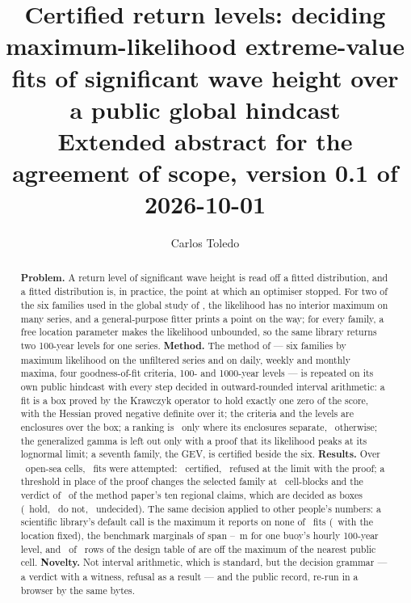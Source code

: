 \documentclass[preprint,10pt,authoryear]{elsarticle}
\begin{document}
\begin{frontmatter}

\title{Certified return levels: deciding maximum-likelihood extreme-value fits of significant wave height over a public global hindcast\\[2pt]\normalsize Extended abstract for the agreement of scope, version 0.1 of 2026-10-01}

\author[a]{Carlos Toledo}

\begin{abstract}
\textbf{Problem.} A return level of significant wave height is read off a fitted distribution, and a fitted distribution is, in practice, the point at which an optimiser stopped. For two of the six families used in the global study of \citet{reis2026}, the likelihood has no interior maximum on many series, and a general-purpose fitter prints a point on the way; for every family, a free location parameter makes the likelihood unbounded, so the same library returns two 100-year levels for one series. \textbf{Method.} The method of \citet{reis2026} --- six families by maximum likelihood on the unfiltered series and on daily, weekly and monthly maxima, four goodness-of-fit criteria, 100- and 1000-year levels --- is repeated on its own public hindcast with every step decided in outward-rounded interval arithmetic: a fit is a box proved by the Krawczyk operator to hold exactly one zero of the score, with the Hessian proved negative definite over it; the criteria and the levels are enclosures over the box; a ranking is \vDecided\ only where its enclosures separate, \vRefused\ otherwise; the generalized gamma is left out only with a proof that its likelihood peaks at its lognormal limit; a seventh family, the GEV, is certified beside the six. \textbf{Results.} Over \ACells\ open-sea cells, \AFits\ fits were attempted: \ACertified\ certified, \AGGLimit\ refused at the limit with the proof; a threshold in place of the proof changes the selected family at \ANaiveDiff\ cell-blocks and the verdict of \AClaimsMoved\ of the method paper's ten regional claims, which are decided as boxes (\AClaimsHold\ hold, \AClaimsFail\ do not, \AClaimsOpen\ undecided). The same decision applied to other people's numbers: a scientific library's default call is the maximum it reports on none of \SFits\ fits (\SFixedAgree\ with the location fixed), the benchmark marginals of \citet{haselsteiner2021} span \BSpreadLo--\BSpreadHi\ m for one buoy's hourly 100-year level, and \TOff\ of \TRows\ rows of the design table of \citet{bhaskaran2023} are off the maximum of the nearest public cell. \textbf{Novelty.} Not interval arithmetic, which is standard, but the decision grammar --- a verdict with a witness, refusal as a result --- and the public record, re-run in a browser by the same bytes.
\end{abstract}


\end{frontmatter}
\end{document}
